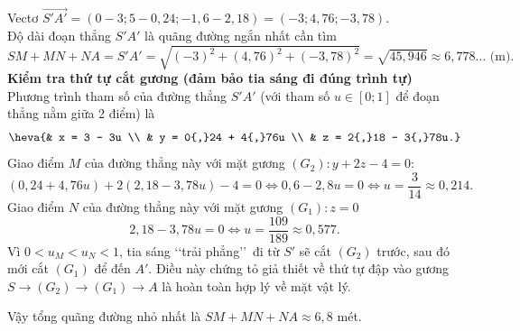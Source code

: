 \begin{ex}
{\begin{itemize}
			Vectơ $\overrightarrow{S'A'} = (0 - 3; 5 - 0{,}24; -1{,}6 - 2{,}18) = (-3; 4{,}76; -3{,}78)$.\\
			Độ dài đoạn thẳng $S'A'$ là quãng đường ngắn nhất cần tìm
			\[ SM + MN + NA = S'A' = \sqrt{(-3)^2 + (4{,}76)^2 + (-3{,}78)^2} = \sqrt{45{,}946} \approx 6{,}778\dots \text{ (m)}.\]
			\textbf{Kiểm tra thứ tự cắt gương (đảm bảo tia sáng đi đúng trình tự)}\\ 
			Phương trình tham số của đường thẳng $S'A'$ (với tham số $u \in [0;1]$ để đoạn thẳng nằm giữa 2 điểm) là
			\[ \heva{& x = 3 - 3u \\ & y = 0{,}24 + 4{,}76u \\ & z = 2{,}18 - 3{,}78u.} \]
			Giao điểm $M$ của đường thẳng này với mặt gương $(G_2) \colon y + 2z - 4 = 0$:
			\[ (0{,}24 + 4{,}76u) + 2(2{,}18 - 3{,}78u) - 4 = 0 \Leftrightarrow 0{,}6 - 2{,}8u = 0 \Leftrightarrow u = \dfrac{3}{14} \approx 0{,}214. \]
			Giao điểm $N$ của đường thẳng này với mặt gương $(G_1) \colon z = 0$
			\[ 2{,}18 - 3{,}78u = 0 \Leftrightarrow u = \dfrac{109}{189} \approx 0{,}577. \]
			Vì $0 < u_M < u_N < 1$, tia sáng \lq\lq trải phẳng\rq\rq~đi từ $S'$ sẽ cắt $(G_2)$ trước, sau đó mới cắt $(G_1)$ để đến $A'$. Điều này chứng tỏ giả thiết về thứ tự đập vào gương $S \to (G_2) \to (G_1) \to A$ là hoàn toàn hợp lý về mặt vật lý.
		\end{itemize}
		Vậy tổng quãng đường nhỏ nhất là $SM + MN + NA \approx 6{,}8$ mét. 
	}
\end{ex}

